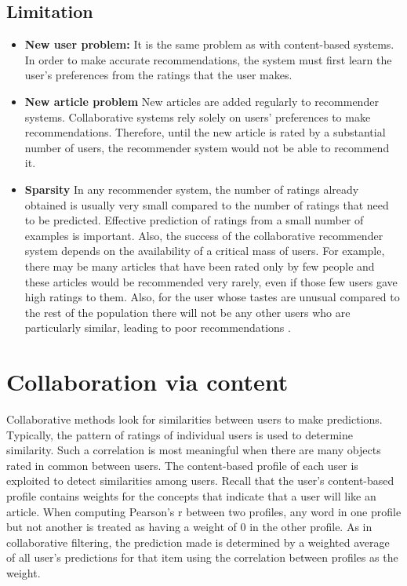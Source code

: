 \subsection{Limitation}
\begin{itemize}
\item {\textbf{New user problem:} It is the same problem as with content-based systems. In order to make accurate recommendations, the system must first learn the user’s preferences from the ratings that the user makes.}

\item{\textbf{New article problem}
New articles are added regularly to recommender systems. Collaborative systems rely solely on users’ preferences to make recommendations. Therefore, until the new article is rated by a substantial number of users, the recommender system would not be able to recommend it.}

\item{\textbf{Sparsity}
In any recommender system, the number of ratings already obtained is usually very small compared to the number of ratings that need to be predicted. Effective prediction of ratings from a small number of examples is important. Also, the success of the collaborative recommender system depends on the availability of a critical mass of users. For example, there may be many articles that have been rated only by few people and these articles would be recommended very rarely, even if those few users gave high ratings to them. Also, for the user whose tastes are unusual compared to the rest of the population there will not be any other users who are particularly similar, leading to poor recommendations \citep{recom_8}.}
\end{itemize}

\section{Collaboration via content}\label{coll_content}
Collaborative methods look for similarities between users to make predictions. Typically, the pattern of ratings of individual users is used to determine similarity. Such a correlation is most meaningful when there are many objects rated in common between users.
The content-based profile of each user is exploited to detect similarities among users. Recall that the user’s content-based profile contains weights for the concepts that indicate that a user will like an article. When computing Pearson’s r between two profiles, any word in one profile but not another is treated as having a weight of 0 in the other profile. As in collaborative filtering, the prediction made is determined by a weighted average of all user’s predictions for that item using the correlation between profiles as the weight.


